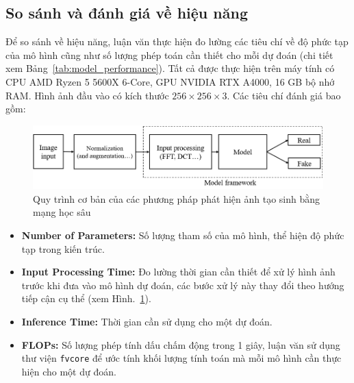 \subsection{So sánh và đánh giá về hiệu năng}
%
%
Để so sánh về hiệu năng, luận văn thực hiện đo lường các tiêu chí về độ phức tạp của mô hình cũng như số lượng phép toán cần thiết cho mỗi dự đoán (chi tiết xem Bảng~\ref{tab:model_performance}). Tất cả được thực hiện trên máy tính có CPU AMD Ryzen 5 5600X 6-Core, GPU NVIDIA RTX A4000, 16 GB bộ nhớ RAM. Hình ảnh đầu vào có kích thước $256 \times 256 \times 3$. Các tiêu chí đánh giá bao gồm:
%
\begin{figure}[ht!]
	\includegraphics[width=\textwidth]{Images/figure_pine_line_1.png}
	\caption{Quy trình cơ bản của các phương pháp phát hiện ảnh tạo sinh bằng mạng học sâu}	
	\label{figure_pine_line_1}
\end{figure}
%
%
\begin{itemize}
	\item \textbf{Number of Parameters:} Số lượng tham số của mô hình, thể hiện độ phức tạp trong kiến trúc.
	\item \textbf{Input Processing Time:} Đo lường thời gian cần thiết để xử lý hình ảnh trước khi đưa vào mô hình dự đoán, các bước xử lý này thay đổi theo hướng tiếp cận cụ thể (xem Hình.~\ref{figure_pine_line_1}).
	\item \textbf{Inference Time:} Thời gian cần sử dụng cho một dự đoán.
	\item \textbf{FLOPs:} Số lượng phép tính dấu chấm động trong 1 giây, luận văn sử dụng thư viện \texttt{fvcore} để ước tính khối lượng tính toán mà mỗi mô hình cần thực hiện cho một dự đoán.
\end{itemize}
%
%






